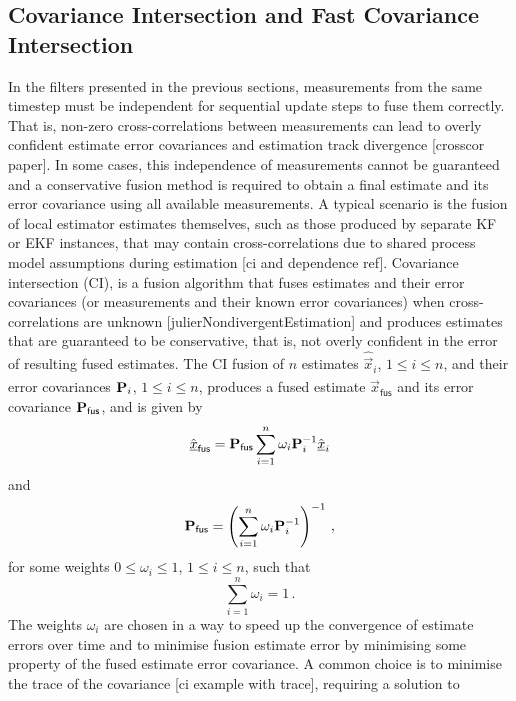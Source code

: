 \subsection{Covariance Intersection and Fast Covariance Intersection}\label{subsec:prelims:fci}
In the filters presented in the previous sections, measurements from the same timestep must be independent for sequential update steps to fuse them correctly. That is, non-zero cross-correlations between measurements can lead to overly confident estimate error covariances and estimation track divergence [crosscor paper]. In some cases, this independence of measurements cannot be guaranteed and a conservative fusion method is required to obtain a final estimate and its error covariance using all available measurements. A typical scenario is the fusion of local estimator estimates themselves, such as those produced by separate KF or EKF instances, that may contain cross-correlations due to shared process model assumptions during estimation [ci and dependence ref]. Covariance intersection (CI), is a fusion algorithm that fuses estimates and their error covariances (or measurements and their known error covariances) when cross-correlations are unknown [julierNondivergentEstimation] and produces estimates that are guaranteed to be conservative, that is, not overly confident in the error of resulting fused estimates. The CI fusion of $n$ estimates $\hat{\vec{x}}_i$, $1\leq i \leq n$, and their error covariances ${{\mathbf{P}}}_i$, $1\leq i \leq n$, produces a fused estimate $\hat{\vec{x}}_{\mathsf{fus}}$ and its error covariance ${{\mathbf{P}}}_{\mathsf{fus}}$, and is given by
\begin{equation}\label{eq:prelims:ci_est}
    \hat{{\underline{x}}}_{\mathsf{fus}} = {{\mathbf{P}}}_{\mathsf{fus}}\sum_{i=1}^n \omega_i {{\mathbf{P}}}_i^{-1} \hat{{\underline{x}}}_i
\end{equation}
and
\begin{equation}\label{eq:prelims:ci_cov}
{\ensuremath{{\mathbf{P}}}}_{\mathsf{fus}}=\left(\sum_{i=1}^{n}\omega_i {{\mathbf{P}}}_i^{-1}\right)^{-1}\,,
\end{equation}
for some weights $0\leq \omega_i \leq 1$, $1\leq i \leq n$, such that
\begin{equation}
    \sum_{i=1}^n \omega_i = 1\,.
\end{equation}
The weights $\omega_i$ are chosen in a way to speed up the convergence of estimate errors over time and to minimise fusion estimate error by minimising some property of the fused estimate error covariance. A common choice is to minimise the trace of the covariance [ci example with trace], requiring a solution to
